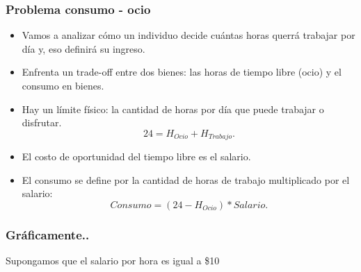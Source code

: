 \documentclass{beamer}
\begin{document}
\begin{frame}
\frametitle{Problema consumo - ocio}
\begin{itemize}
    \item Vamos a analizar cómo un individuo decide cuántas horas querrá trabajar por día y, eso definirá su ingreso.
    \item Enfrenta un trade-off entre dos bienes: las horas de tiempo libre (ocio) y el consumo en bienes.
    \item Hay un límite físico: la cantidad de horas por día que puede trabajar o disfrutar.
    \begin{equation}
     24 = H_{Ocio} + H_{Trabajo}.
    \end{equation}
    \item El costo de oportunidad del tiempo libre es el salario. 
    \item El consumo se define por la cantidad de horas de trabajo multiplicado por el salario:
    \begin{equation}
    Consumo = (24-H_{Ocio}) * Salario. 
    \end{equation}
\end{itemize}
\end{frame}


\begin{frame}
\frametitle{Gráficamente..}
Supongamos que el salario por hora es igual a \$10 \pause
    \begin{center}
    \begin{figure}[H]
    \renewcommand{\figurename}{Figure}
    \begin{center}
    \end{center}
    \label{fig:C6.17}
    \end{figure}
    \end{center}
\end{frame}
\end{document}
